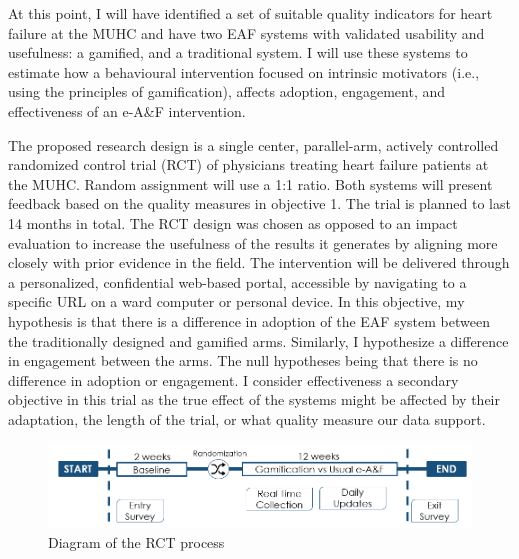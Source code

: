 At this point, I will have identified a set of suitable quality indicators for heart failure at the MUHC and have two \gls{EAF} systems with validated usability and usefulness: a gamified, and a traditional system. I will use these systems to estimate how a behavioural intervention focused on intrinsic motivators (i.e., using the principles of gamification), affects adoption, engagement, and effectiveness of an e-A\&F intervention.

The proposed research design is a single center, parallel-arm, actively controlled randomized control trial (\gls{RCT}) of physicians treating heart failure patients at the \gls{MUHC}. Random assignment will use a 1:1 ratio. Both systems will present feedback based on the quality measures in objective 1. The trial is planned to last 14 months in total. The RCT design was chosen as opposed to an impact evaluation to increase the usefulness of the results it generates by aligning more closely with prior evidence in the field. The intervention will be delivered through a personalized, confidential web-based portal, accessible by navigating to a specific URL on a ward computer or personal device. In this objective, my hypothesis is that there is a difference in adoption of the \gls{EAF} system between the traditionally designed and gamified arms. Similarly, I hypothesize a difference in engagement between the arms. The null hypotheses being that there is no difference in adoption or engagement. I consider effectiveness a secondary objective in this trial as the true effect of the systems might be affected by their adaptation, the length of the trial, or what quality measure our data support.

\begin{figure}[h]
    \centering
    \includegraphics[width=\textwidth]{img/rct_flow.png}
    \caption{Diagram of the RCT process}
    \label{fig:rct_flow}
\end{figure}

